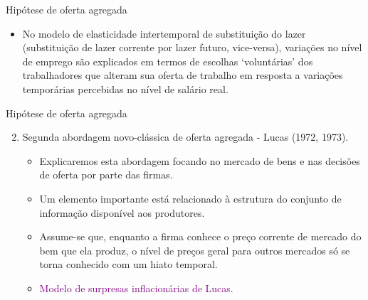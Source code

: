 \documentclass[10pt]{beamer}
\begin{document}
\begin{frame}{Hipótese de oferta agregada}
    \begin{itemize}
        \item No modelo de elasticidade intertemporal de substituição do lazer (substituição de lazer corrente por lazer futuro, vice-versa), variações no nível de emprego são explicados em termos de escolhas `voluntárias' dos trabalhadores que alteram sua oferta de trabalho em resposta a variações temporárias percebidas no nível de salário real.
    \end{itemize}
\end{frame}

\begin{frame}{Hipótese de oferta agregada}
    \begin{enumerate}
        \setcounter{enumi}{1}
        \item Segunda abordagem novo-clássica de oferta agregada - Lucas (1972, 1973).
        \bigskip
        \begin{itemize}
            \item Explicaremos esta abordagem focando no mercado de bens e nas decisões de oferta por parte das firmas.
            \bigskip
            \item Um elemento importante está relacionado à estrutura do conjunto de informação disponível aos produtores.
            \bigskip
            \item Assume-se que, enquanto a firma conhece o preço corrente de mercado do bem que ela produz, o nível de preços geral para outros mercados só se torna conhecido com um hiato temporal.
            \bigskip
            \item \textcolor{purple}{Modelo de surpresas inflacionárias de Lucas}.
        \end{itemize}
    \end{enumerate}
\end{frame}
\end{document}
